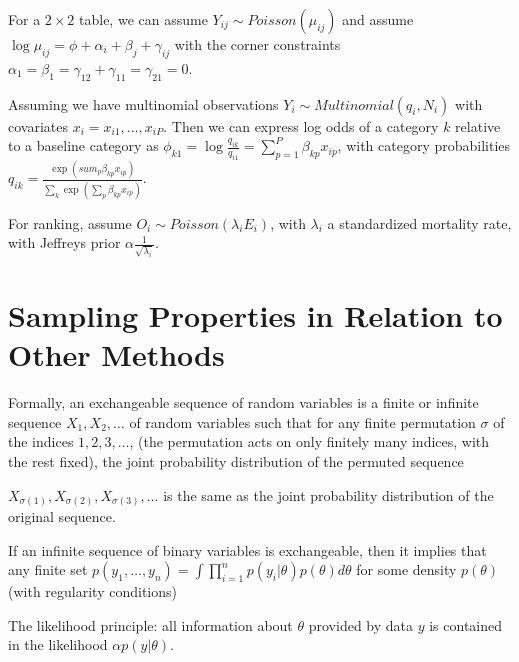 For a $2 \times 2$ table, we can assume $Y_{ij} \sim
Poisson(\mu_{ij})$ and assume $\log \mu_{ij} = \phi + \alpha_{i} +
\beta_{j} + \gamma_{ij}$ with the corner constraints $\alpha_{1} =
\beta_{1} = \gamma_{12} + \gamma_{11} = \gamma_{21} = 0$.

Assuming we have multinomial observations $Y_{i} \sim
Multinomial(q_{i}, N_{i})$ with covariates $x_{i} = x_{i1}, \dots,
x_{iP}$.  Then we can express log odds of a category $k$ relative to a
baseline category as $\phi_{k1} = \log \frac{q_{ik}}{q_{i1}} =
\sum_{p=1}^{P} \beta_{kp} x_{ip}$, with category probabilities $q_{ik}
= \frac{\exp(sum_{p} \beta_{kp} x_{ip})}{\sum_{k}^{} \exp(\sum_{p}^{}
  \beta_{kp} x_{ip})}$.

\begin{defn}
  \label{sec:categ-data-pred-2}
  For ranking, assume $O_{i} \sim Poisson(\lambda_{i} E_{i})$, with
  $\lambda_{i}$ a standardized mortality rate, with Jeffreys prior
  $\alpha \frac{1}{\sqrt{\lambda_{i}}}$.
\end{defn}

\section{Sampling Properties in Relation to Other Methods}
\label{sec:sampl-prop-relat}

\begin{defn}
  Formally, an exchangeable sequence of random variables is a finite
  or infinite sequence $X_{1}, X_{2}, \dots$ of random variables such
  that for any finite permutation $\sigma$ of the indices $1, 2, 3,
  \dots$, (the permutation acts on only finitely many indices, with
  the rest fixed), the joint probability distribution of the permuted
  sequence

  $X_{\sigma(1)}, X_{\sigma(2)}, X_{\sigma(3)}, \dots$ is the same as
  the joint probability distribution of the original
  sequence.
\end{defn}

\begin{thm}
  \label{sec:sampl-prop-relat-2}
  If an infinite sequence of binary variables is exchangeable, then it
  implies that any finite set $p(y_{1}, \dots, y_{n}) = \int
  \prod_{i=1}^{n} p(y_{i} | \theta) p(\theta) d \theta$ for some
  density $p(\theta)$ (with regularity conditions)
\end{thm}

\begin{defn}
  \label{sec:sampl-prop-relat-3}
  The likelihood principle: all information about $\theta$ provided by
  data $y$ is contained in the likelihood $\alpha p(y | \theta)$.
\end{defn}


